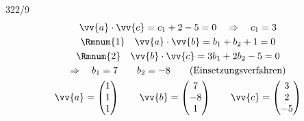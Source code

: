 \begin{exercise}{322/9}
\begin{gather*}
    \vv{a} \cdot \vv{c} = c_1 + 2 - 5 = 0 \quad\Rightarrow\quad c_1 = 3 \\
    \text{\Rmnum{1}} \quad \vv{a} \cdot \vv{b} = b_1 + b_2 + 1 = 0 \\
    \text{\Rmnum{2}} \quad \vv{b} \cdot \vv{c} = 3b_1 + 2b_2 - 5 = 0 \\
    \Rightarrow\quad b_1 = 7 \qquad b_2 = -8 \qquad \text{(Einsetzungsverfahren)} \\
    \vv{a} = \begin{pmatrix}1 \\ 1 \\ 1\end{pmatrix} \qquad \vv{b} = \begin{pmatrix}7 \\ -8 \\ 1\end{pmatrix} \qquad \vv{c} = \begin{pmatrix}3 \\ 2 \\ -5\end{pmatrix}
  \end{gather*}
\end{exercise}
